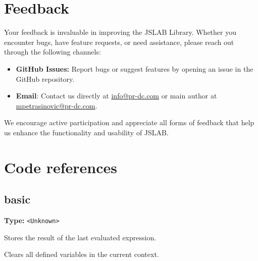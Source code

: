 \documentclass[12pt,a4paper]{article}
\begin{document}
\section{Feedback}

Your feedback is invaluable in improving the JSLAB Library. Whether you encounter bugs, have feature requests, or need assistance, please reach out through the following channels:

\begin{itemize}
    \item \textbf{GitHub Issues:} Report bugs or suggest features by opening an issue in the GitHub repository.
    
    \item \textbf{Email}: Contact us directly at \href{mailto:info@pr-dc.com}{info@pr-dc.com} or main author at \href{mailto:mpetrasinovic@pr-dc.com}{mpetrasinovic@pr-dc.com}.
\end{itemize}

We encourage active participation and appreciate all forms of feedback that help us enhance the functionality and usability of JSLAB.

\section{Code references}

\subsection{basic}
\vspace{5mm}
\noindent {}\vspace{4mm}


\noindent \textbf{Type:} \texttt{<Unknown>}

\noindent Stores the result of the last evaluated expression.

\vspace{5mm}
\noindent {}


\noindent Clears all defined variables in the current context.

\vspace{5mm}
\noindent {}
\end{document}
